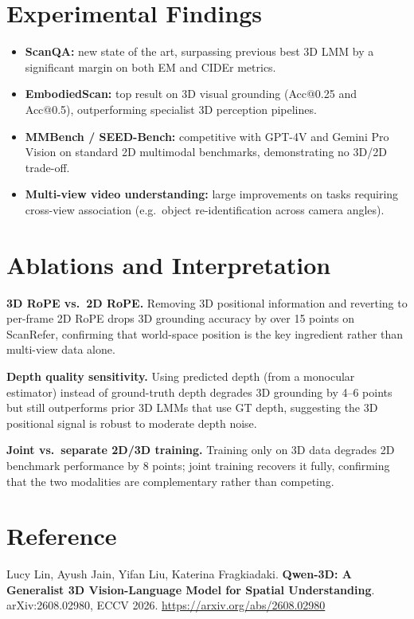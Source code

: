 \documentclass[10pt,twocolumn]{article}
\begin{document}
\section{Experimental Findings}

\begin{itemize}[itemsep=2pt,parsep=0pt]
  \item \textbf{ScanQA:} new state of the art, surpassing previous best 3D LMM by
    a significant margin on both EM and CIDEr metrics.
  \item \textbf{EmbodiedScan:} top result on 3D visual grounding (Acc@0.25 and Acc@0.5),
    outperforming specialist 3D perception pipelines.
  \item \textbf{MMBench / SEED-Bench:} competitive with GPT-4V and Gemini Pro Vision
    on standard 2D multimodal benchmarks, demonstrating no 3D/2D trade-off.
  \item \textbf{Multi-view video understanding:} large improvements on tasks requiring
    cross-view association (e.g.\ object re-identification across camera angles).
\end{itemize}

\section{Ablations and Interpretation}

\textbf{3D RoPE vs.\ 2D RoPE.} Removing 3D positional information and reverting to
per-frame 2D RoPE drops 3D grounding accuracy by over 15 points on ScanRefer,
confirming that world-space position is the key ingredient rather than multi-view data
alone.

\textbf{Depth quality sensitivity.} Using predicted depth (from a monocular estimator)
instead of ground-truth depth degrades 3D grounding by 4--6 points but still
outperforms prior 3D LMMs that use GT depth, suggesting the 3D positional signal is
robust to moderate depth noise.

\textbf{Joint vs.\ separate 2D/3D training.} Training only on 3D data degrades 2D
benchmark performance by 8 points; joint training recovers it fully, confirming that
the two modalities are complementary rather than competing.

\section*{Reference}

Lucy Lin, Ayush Jain, Yifan Liu, Katerina Fragkiadaki.
\textbf{Qwen-3D: A Generalist 3D Vision-Language Model for Spatial Understanding}.
arXiv:2608.02980, ECCV 2026.
\url{https://arxiv.org/abs/2608.02980}
\end{document}
